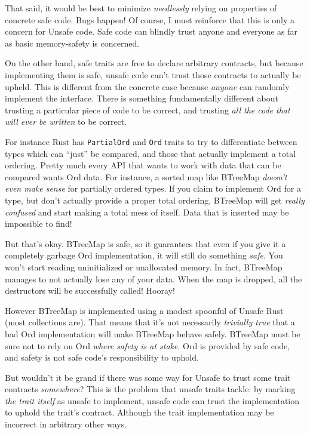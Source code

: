 \documentclass[a4paper,]{book}
\begin{document}
That said, it would be best to minimize \emph{needlessly} relying on
properties of concrete safe code. Bugs happen! Of course, I must
reinforce that this is only a concern for Unsafe code. Safe code can
blindly trust anyone and everyone as far as basic memory-safety is
concerned.

On the other hand, safe traits are free to declare arbitrary contracts,
but because implementing them is safe, unsafe code can't trust those
contracts to actually be upheld. This is different from the concrete
case because \emph{anyone} can randomly implement the interface. There
is something fundamentally different about trusting a particular piece
of code to be correct, and trusting \emph{all the code that will ever be
written} to be correct.

For instance Rust has \texttt{PartialOrd} and \texttt{Ord} traits to try
to differentiate between types which can ``just'' be compared, and those
that actually implement a total ordering. Pretty much every API that
wants to work with data that can be compared wants Ord data. For
instance, a sorted map like BTreeMap \emph{doesn't even make sense} for
partially ordered types. If you claim to implement Ord for a type, but
don't actually provide a proper total ordering, BTreeMap will get
\emph{really confused} and start making a total mess of itself. Data
that is inserted may be impossible to find!

But that's okay. BTreeMap is safe, so it guarantees that even if you
give it a completely garbage Ord implementation, it will still do
something \emph{safe}. You won't start reading uninitialized or
unallocated memory. In fact, BTreeMap manages to not actually lose any
of your data. When the map is dropped, all the destructors will be
successfully called! Hooray!

However BTreeMap is implemented using a modest spoonful of Unsafe Rust
(most collections are). That means that it's not necessarily
\emph{trivially true} that a bad Ord implementation will make BTreeMap
behave safely. BTreeMap must be sure not to rely on Ord \emph{where
safety is at stake}. Ord is provided by safe code, and safety is not
safe code's responsibility to uphold.

But wouldn't it be grand if there was some way for Unsafe to trust some
trait contracts \emph{somewhere}? This is the problem that unsafe traits
tackle: by marking \emph{the trait itself} as unsafe to implement,
unsafe code can trust the implementation to uphold the trait's contract.
Although the trait implementation may be incorrect in arbitrary other
ways.
\end{document}
